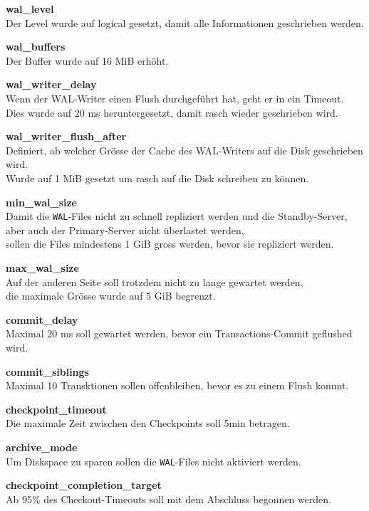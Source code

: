 \begin{description}
    \item \textbf{wal\_level}\hfill \\Der Level wurde auf logical gesetzt, damit alle Informationen geschrieben werden.
    \item \textbf{wal\_buffers}\hfill \\Der Buffer wurde auf 16 MiB erhöht.
    \item \textbf{wal\_writer\_delay}\hfill \\Wenn der WAL-Writer einen Flush durchgeführt hat, geht er in ein Timeout.\\Dies wurde auf 20 ms heruntergesetzt, damit rasch wieder geschrieben wird.
    \item \textbf{wal\_writer\_flush\_after}\hfill \\Definiert, ab welcher Grösse der Cache des WAL-Writers auf die Disk geschrieben wird.\\Wurde auf 1 MiB gesetzt um rasch auf die Disk schreiben zu können.
    \item \textbf{min\_wal\_size}\hfill \\Damit die \texttt{WAL}-Files nicht zu schnell repliziert werden und die Standby-Server, aber auch der Primary-Server nicht überlastet werden,\\sollen die Files mindestens 1 GiB gross werden, bevor sie repliziert werden.
    \item \textbf{max\_wal\_size}\hfill \\Auf der anderen Seite soll trotzdem nicht zu lange gewartet werden,\\die maximale Grösse wurde auf 5 GiB begrenzt.
    \item \textbf{commit\_delay}\hfill \\Maximal 20 ms soll gewartet werden, bevor ein Transactions-Commit geflushed wird.
    \item \textbf{commit\_siblings}\hfill \\Maximal 10 Transktionen sollen offenbleiben, bevor es zu einem Flush kommt.
    \item \textbf{checkpoint\_timeout}\hfill \\Die maximale Zeit zwischen den Checkpoints soll 5min betragen.
    \item \textbf{archive\_mode}\hfill \\Um Diskspace zu sparen sollen die \texttt{WAL}-Files nicht aktiviert werden.
    \item \textbf{checkpoint\_completion\_target}\hfill \\Ab 95\% des Checkout-Timeouts soll mit dem Abschluss begonnen werden.

\end{description}
